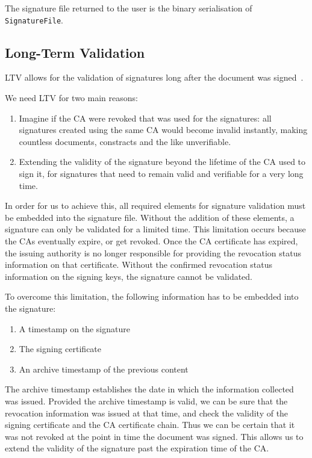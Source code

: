 The signature file returned to the user is the binary serialisation of \texttt{SignatureFile}.


\subsection{Long-Term Validation}\label{subsec:long-term-validation}
\glsdesc{LTV} allows for the validation of signatures long after the document was signed~\cite{etsipades}.

We need \gls{LTV} for two main reasons:
\begin{enumerate}
    \item Imagine if the \gls{CA} were revoked that was used for the signatures: all signatures created using the same \gls{CA} would become invalid instantly, making countless documents, constracts and the like unverifiable.
    \item Extending the validity of the signature beyond the lifetime of the \gls{CA} used to sign it, for signatures that need to remain valid and verifiable for a very long time.
\end{enumerate}
In order for us to achieve this, all required elements for signature validation must be embedded into the signature file.
Without the addition of these elements, a signature can only be validated for a limited time.
This limitation occurs because the \gls{CA}s eventually expire, or get revoked.
Once the \gls{CA} certificate has expired, the issuing authority is no longer responsible for providing the revocation status information on that certificate.
Without the confirmed revocation status information on the signing keys, the signature cannot be validated.

To overcome this limitation, the following information has to be embedded into the signature:
\begin{enumerate}
    \item A timestamp on the signature
    \item The signing certificate
    \item An archive timestamp of the previous content
\end{enumerate}

The archive timestamp establishes the date in which the information collected was issued.
Provided the archive timestamp is valid,
we can be sure that the revocation information was issued at that time,
and check the validity of the signing certificate and the \gls{CA} certificate chain.
Thus we can be certain that it was not revoked at the point in time the document was signed.
This allows us to extend the validity of the signature past the expiration time of the \gls{CA}.

